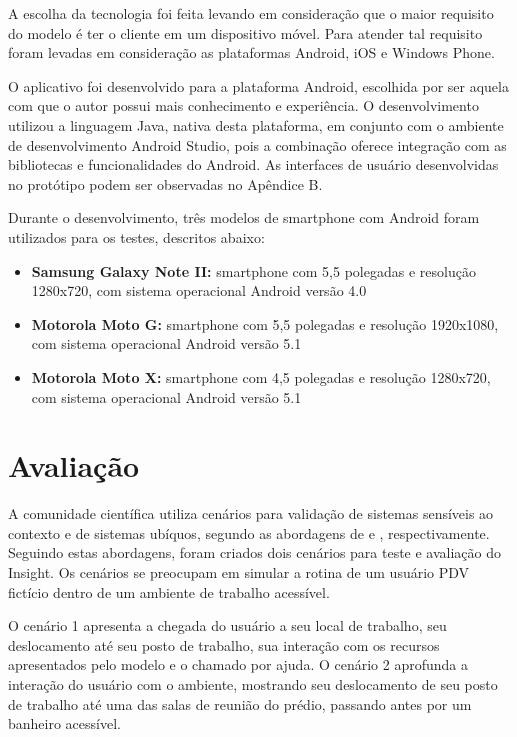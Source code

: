 \documentclass[twoside,english,brazilian]{UNISINOSartigo}
\begin{document}
A escolha da tecnologia foi feita levando em consideração que o maior requisito do modelo é ter o cliente em um dispositivo móvel. Para atender tal requisito foram levadas em consideração as plataformas Android, iOS e Windows Phone. 

O aplicativo foi desenvolvido para a plataforma Android, escolhida por ser aquela com que o autor possui mais conhecimento e experiência. O desenvolvimento utilizou a linguagem Java, nativa desta plataforma, em conjunto com o ambiente de desenvolvimento Android Studio, pois a combinação oferece integração com as bibliotecas e funcionalidades do Android. As interfaces de usuário desenvolvidas no protótipo podem ser observadas no Apêndice B.

Durante o desenvolvimento, três modelos de smartphone com Android foram utilizados para os testes, descritos abaixo:

\begin{itemize}
\item \textbf{Samsung Galaxy Note II:} smartphone com 5,5 polegadas e resolução 1280x720, com sistema operacional Android versão 4.0
\item \textbf{Motorola Moto G:} smartphone com 5,5 polegadas e resolução 1920x1080, com sistema operacional Android versão 5.1
\item \textbf{Motorola Moto X:} smartphone com 4,5 polegadas e resolução 1280x720, com sistema operacional Android versão 5.1
\end{itemize}

\section{Avaliação}
A comunidade científica utiliza cenários para validação de sistemas sensíveis ao contexto e de sistemas ubíquos, segundo as abordagens de  e , respectivamente. Seguindo estas abordagens, foram criados dois cenários para teste e avaliação do Insight. Os cenários se preocupam em simular a rotina de um usuário PDV fictício dentro de um ambiente de trabalho acessível. 

O cenário 1 apresenta a chegada do usuário a seu local de trabalho, seu deslocamento até seu posto de trabalho, sua interação com os recursos apresentados pelo modelo e o chamado por ajuda. O cenário 2 aprofunda a interação do usuário com o ambiente, mostrando seu deslocamento de seu posto de trabalho até uma das salas de reunião do prédio, passando antes por um banheiro acessível.
\end{document}
